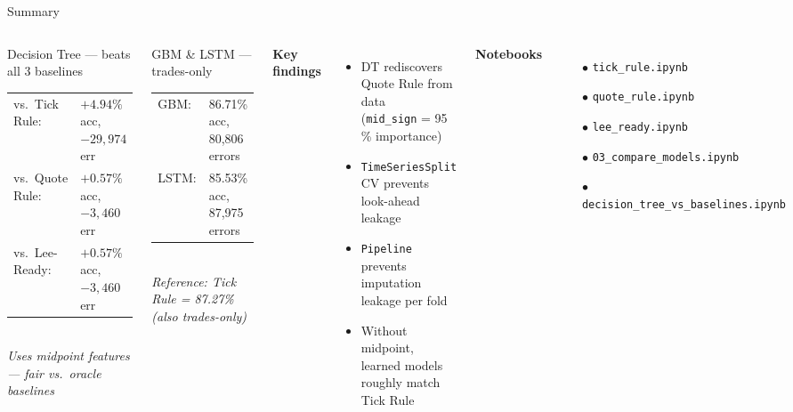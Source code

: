 \documentclass[aspectratio=169,10pt]{beamer}
\newcommand{\code}[1]{\texttt{\small #1}}
\begin{document}
\begin{frame}{Summary}
  \begin{columns}[T]
    \begin{block}{Decision Tree — beats all 3 baselines}
      \begin{tabular}{ll}
        vs.\ Tick Rule:   & $+4.94\%$ acc, $-29{,}974$ err \\
        vs.\ Quote Rule:  & $+0.57\%$ acc, $-3{,}460$ err \\
        vs.\ Lee-Ready:   & $+0.57\%$ acc, $-3{,}460$ err \\
      \end{tabular}\\[0.4em]
      {\small \textit{Uses midpoint features — fair vs.\ oracle baselines}}
    \end{block}

    \medskip
    \begin{block}{GBM \& LSTM — trades-only}
      \begin{tabular}{ll}
        GBM:  & 86.71\% acc, 80{,}806 errors \\
        LSTM: & 85.53\% acc, 87{,}975 errors \\
      \end{tabular}\\[0.4em]
      {\small \textit{Reference: Tick Rule = 87.27\% (also trades-only)}}
    \end{block}

    \textbf{Key findings}
    \begin{itemize}
      \item DT rediscovers Quote Rule from data \\
            (\code{mid\_sign} = 95\,\% importance)
      \item \code{TimeSeriesSplit} CV prevents look-ahead leakage
      \item \code{Pipeline} prevents imputation leakage per fold
      \item Without midpoint, learned models roughly match Tick Rule
    \end{itemize}

    \medskip
    \textbf{Notebooks}
    \begin{itemize}\setlength\itemsep{0pt}
      \item[\small$\bullet$] \code{tick\_rule.ipynb}
      \item[\small$\bullet$] \code{quote\_rule.ipynb}
      \item[\small$\bullet$] \code{lee\_ready.ipynb}
      \item[\small$\bullet$] \code{03\_compare\_models.ipynb}
      \item[\small$\bullet$] \code{decision\_tree\_vs\_baselines.ipynb}
    \end{itemize}
  \end{columns}
\end{frame}
\end{document}
